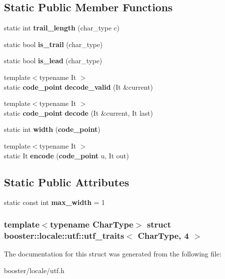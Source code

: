 \subsection*{\-Static \-Public \-Member \-Functions}
\begin{DoxyCompactItemize}
\item 
static int {\bfseries trail\-\_\-length} (char\-\_\-type c)\label{structbooster_1_1locale_1_1utf_1_1utf__traits_3_01CharType_00_014_01_4_a7495d5f1a40d322c3aa31538e8ac8ed9}

\item 
static bool {\bfseries is\-\_\-trail} (char\-\_\-type)\label{structbooster_1_1locale_1_1utf_1_1utf__traits_3_01CharType_00_014_01_4_a45e91c957414c7db0ddc55b4dee72861}

\item 
static bool {\bfseries is\-\_\-lead} (char\-\_\-type)\label{structbooster_1_1locale_1_1utf_1_1utf__traits_3_01CharType_00_014_01_4_a4cebda25077792ef3301af64a7c59ef1}

\item 
{\footnotesize template$<$typename It $>$ }\\static {\bf code\-\_\-point} {\bfseries decode\-\_\-valid} (\-It \&current)\label{structbooster_1_1locale_1_1utf_1_1utf__traits_3_01CharType_00_014_01_4_acf7afcb5bf50b0ed0194588da2939e97}

\item 
{\footnotesize template$<$typename It $>$ }\\static {\bf code\-\_\-point} {\bfseries decode} (\-It \&current, \-It last)\label{structbooster_1_1locale_1_1utf_1_1utf__traits_3_01CharType_00_014_01_4_a5937c23b67318efa7a5950b0f549e755}

\item 
static int {\bfseries width} ({\bf code\-\_\-point})\label{structbooster_1_1locale_1_1utf_1_1utf__traits_3_01CharType_00_014_01_4_a3f89516cc122545d14c953c824f937f5}

\item 
{\footnotesize template$<$typename It $>$ }\\static \-It {\bfseries encode} ({\bf code\-\_\-point} u, \-It out)\label{structbooster_1_1locale_1_1utf_1_1utf__traits_3_01CharType_00_014_01_4_a82f9614fe82f33ca1829c410d8a7f5d5}

\end{DoxyCompactItemize}
\subsection*{\-Static \-Public \-Attributes}
\begin{DoxyCompactItemize}
\item 
static const int {\bfseries max\-\_\-width} = 1\label{structbooster_1_1locale_1_1utf_1_1utf__traits_3_01CharType_00_014_01_4_aebcb701e76251c9a913929ac2682fba9}

\end{DoxyCompactItemize}
\subsubsection*{template$<$typename Char\-Type$>$ struct booster\-::locale\-::utf\-::utf\-\_\-traits$<$ Char\-Type, 4 $>$}



\-The documentation for this struct was generated from the following file\-:\begin{DoxyCompactItemize}
\item 
booster/locale/utf.\-h\end{DoxyCompactItemize}
